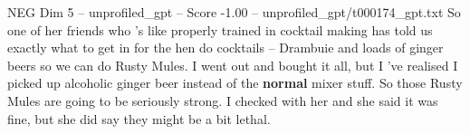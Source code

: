 \begin{textsample}{NEG Dim 5 – unprofiled\_gpt – Score -1.00 – unprofiled\_gpt/t000174\_gpt.txt}  \label{ex:f5_neg_020}
So one of her friends who ’s like properly trained in cocktail making has told us exactly what to get in for the hen do cocktails – Drambuie and loads of ginger beers so we can do Rusty Mules.
I went out and bought it all, but I ’ve realised I picked up alcoholic ginger beer instead of the \textbf{normal} mixer stuff.
So those Rusty Mules are going to be seriously strong.
I checked with her and she said it was fine, but she did say they might be a bit lethal.

\end{textsample}
